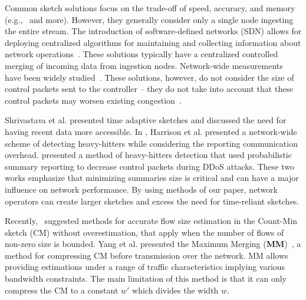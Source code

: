 Common sketch solutions focus on the trade-off of speed, accuracy, and memory (e.g.,~\cite{CountMin, cormode2011sketch, metwally2005efficient, sivaraman2017heavy, estan2003new,  9667240, 9068483, Rottenstreich21} and more). However, they generally consider only a single node ingesting the entire stream.
The introduction of software-defined networks (SDN) allows for deploying
centralized algorithms for maintaining and collecting information about network
operations~\cite{yu2013software}. These solutions typically have a centralized controlled merging
of incoming data from ingestion nodes. Network-wide measurements have
been widely studied~\cite{afek2018detecting,anderson2017high,li2016flowradar,harrison2020carpe}. These solutions, however, do not consider the size of control packets sent to the controller -- they do not take into account that these control packets may worsen existing congestion~\cite{zhang2010optimizing, benson2010understanding}.

 Shrivastava et al.\cite{shrivastava2016time} presented time adaptive sketches and discussed the need for having recent data more accessible. In \cite{harrison2018network}, Harrison et al. presented a network-wide scheme of detecting heavy-hitters while considering the reporting communication overhead. \cite{harrison2020carpe} presented a method of heavy-hitters detection that used probabilistic summary reporting to decrease control packets during DDoS attacks. These two works emphasize that minimizing summaries size is critical and can have a major influence on network performance. By using methods of our paper, network operators can create larger sketches and excess the need for time-reliant sketches. 


Recently,~\cite{FPFZCM} suggested methods for accurate flow size estimation in the Count-Min sketch (CM)  without overestimation, that apply when the number of flows of non-zero size is bounded. 
Yang et al. presented the Maximum Merging (\textbf{MM})~\cite{yang2018elastic}, a method for compressing CM before transmission over the network. MM allows providing estimations under a range of traffic characteristics implying various bandwidth constraints. The main limitation of this method is that it can only compress the CM to a constant $w'$ which divides the width $w$.


